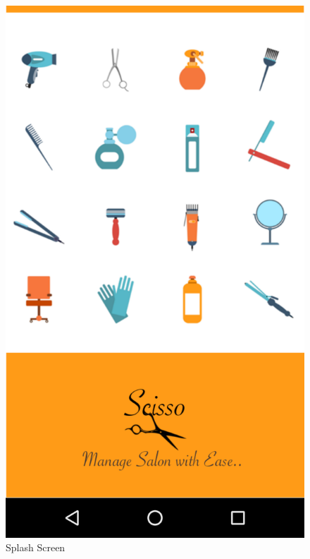 \begin{figure}[h]
	\centering
	\includegraphics[width=0.7\linewidth]{SplashYes}
	\caption{Splash Screen}
\end{figure}
\pagebreak

